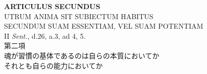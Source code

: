 \documentclass[paper=a4paper,fontsize=10pt,jafontsize=9pt,titlepage]{jlreq}
\begin{document}
\newpage



{}
\setcounter{section}{2}
\setcounter{subsection}{0}
\begin{center}
{\Large {\bfseries ARTICULUS SECUNDUS}}\\
{\large UTRUM ANIMA SIT SUBIECTUM HABITUS\\SECUNDUM SUAM ESSENTIAM, VEL SUAM POTENTIAM}\\
{\footnotesize II {\itshape Sent.}, d.26, a.3, ad 4, 5.}\\
{\Large 第二項\\魂が習慣の基体であるのは自らの本質においてか\\それとも自らの能力においてか}
\end{center}
\end{document}
